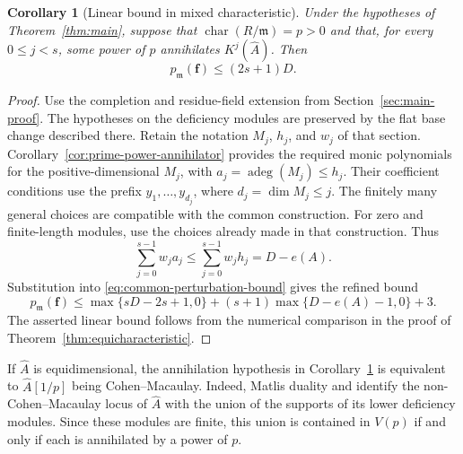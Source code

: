 \documentclass[11pt,reqno]{amsart}
\numberwithin{equation}{section}
\newtheorem{corollary}[theorem]{Corollary}
\theoremstyle{definition}
\newcommand{\m}{\mathfrak m}
\newcommand{\f}{\mathbf f}
\newcommand{\adeg}{\operatorname{adeg}}
\begin{document}
\begin{corollary}[Linear bound in mixed characteristic]
\label{cor:prime-power-deficiencies}
Under the hypotheses of Theorem~\ref{thm:main}, suppose that
$\operatorname{char}(R/\m)=p>0$ and that, for every $0\le j<s$,
some power of $p$ annihilates $K^j(\widehat A)$.
Then
\[
 p_{\m}(\f)\le(2s+1)D.
\]
\end{corollary}

\begin{proof}
Use the completion and residue-field extension from
Section~\ref{sec:main-proof}. The hypotheses on the deficiency
modules are preserved by the flat base change described there.
Retain the notation $M_j$, $h_j$, and $w_j$ of that section.
Corollary~\ref{cor:prime-power-annihilator} provides the required
monic polynomials for the positive-dimensional $M_j$, with
$a_j=\adeg(M_j)\le h_j$. Their coefficient conditions use the
prefix $y_1,\ldots,y_{d_j}$, where $d_j=\dim M_j\le j$.
The finitely many general choices are compatible with the common
construction. For zero and finite-length modules, use the choices
already made in that construction. Thus
\[
 \sum_{j=0}^{s-1}w_ja_j\le\sum_{j=0}^{s-1}w_jh_j=D-e(A).
\]
Substitution into \eqref{eq:common-perturbation-bound} gives
the refined bound
\begin{equation}\label{eq:prime-power-refined}
 p_{\m}(\f)\le
 \max\{sD-2s+1,0\}+(s+1)\max\{D-e(A)-1,0\}+3.
\end{equation}
The asserted linear bound follows from the numerical comparison
in the proof of Theorem~\ref{thm:equicharacteristic}.
\end{proof}

If $\widehat A$ is equidimensional, the annihilation hypothesis
in Corollary~\ref{cor:prime-power-deficiencies} is equivalent to
$\widehat A[1/p]$ being Cohen--Macaulay.
Indeed, Matlis duality and \cite[Lemma~4.2]{MQS} identify the
non-Cohen--Macaulay locus of $\widehat A$ with the union of the
supports of its lower deficiency modules.
Since these modules are finite, this union is contained in
$V(p)$ if and only if each is annihilated by a power of $p$.
\end{document}
